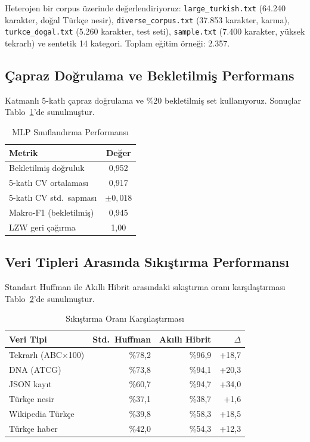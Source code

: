 \documentclass[conference]{IEEEtran}
\begin{document}
Heterojen bir corpus üzerinde değerlendiriyoruz: \texttt{large\_turkish.txt} (64.240 karakter, doğal Türkçe nesir), \texttt{diverse\_corpus.txt} (37.853 karakter, karma), \texttt{turkce\_dogal.txt} (5.260 karakter, test seti), \texttt{sample.txt} (7.400 karakter, yüksek tekrarlı) ve sentetik 14 kategori. Toplam eğitim örneği: 2.357.

\subsection{Çapraz Doğrulama ve Bekletilmiş Performans}

Katmanlı 5-katlı çapraz doğrulama ve \%20 bekletilmiş set kullanıyoruz. Sonuçlar Tablo~\ref{tab:mlp_perf}'de sunulmuştur.

\begin{table}[h]
\caption{MLP Sınıflandırma Performansı}
\label{tab:mlp_perf}
\centering
\begin{tabular}{@{}lc@{}}
\toprule
Metrik & Değer \\
\midrule
Bekletilmiş doğruluk & 0,952 \\
5-katlı CV ortalaması & 0,917 \\
5-katlı CV std.\ sapması & \(\pm 0,018\) \\
Makro-F1 (bekletilmiş) & 0,945 \\
LZW geri çağırma & 1,00 \\
\bottomrule
\end{tabular}
\end{table}

\subsection{Veri Tipleri Arasında Sıkıştırma Performansı}

Standart Huffman ile Akıllı Hibrit arasındaki sıkıştırma oranı karşılaştırması Tablo~\ref{tab:comp_ratio}'de sunulmuştur.

\begin{table}[h]
\caption{Sıkıştırma Oranı Karşılaştırması}
\label{tab:comp_ratio}
\centering
\small
\begin{tabular}{@{}lrrr@{}}
\toprule
Veri Tipi & Std.\ Huffman & Akıllı Hibrit & \(\Delta\) \\
\midrule
Tekrarlı (ABC\(\times\)100) & \%78,2 & \%96,9 & +18,7 \\
DNA (ATCG) & \%73,8 & \%94,1 & +20,3 \\
JSON kayıt & \%60,7 & \%94,7 & +34,0 \\
Türkçe nesir & \%37,1 & \%38,7 & +1,6 \\
Wikipedia Türkçe & \%39,8 & \%58,3 & +18,5 \\
Türkçe haber & \%42,0 & \%54,3 & +12,3 \\
\bottomrule
\end{tabular}
\end{table}
\end{document}
